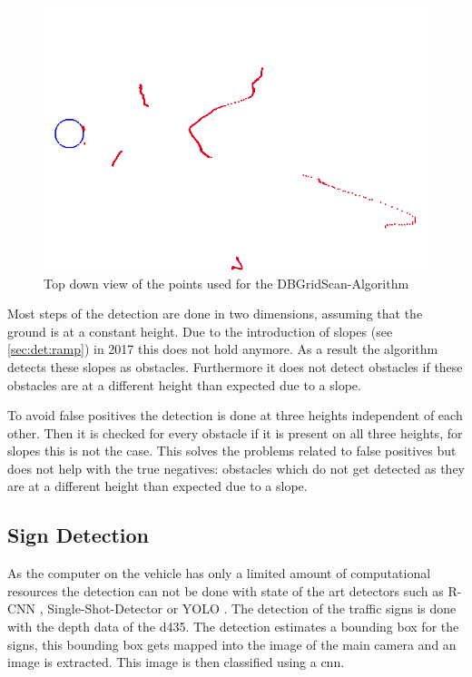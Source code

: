 \begin{figure}[h!]
    \centering
    \includegraphics[width=\textwidth]{../Material/depth_slice.png}
    \caption{Top down view of the points used for the DBGridScan-Algorithm}
    \label{fig:det:dbtopdown}
\end{figure}

Most steps of the detection are done in two dimensions, assuming that the ground is at a constant height. 
Due to the introduction of slopes (see \ref{sec:det:ramp}) in 2017 this does not hold anymore. 
As a result the algorithm detects these slopes as obstacles. 
Furthermore it does not detect obstacles if these obstacles are at a different height than expected due to a slope.

To avoid false positives the detection is done at three heights independent of each other. 
Then it is checked for every obstacle if it is present on all three heights, for slopes this is not the case. 
This solves the problems related to false positives but does not help with the true negatives: obstacles which do not get detected as they are at a different height than expected due to a slope.

\subsection{Sign Detection}
As the computer on the vehicle has only a limited amount of computational resources the detection can not be done with state of the art detectors such as R-CNN \cite{rcnn}, Single-Shot-Detector \cite{ssd} or YOLO \cite{yolo}. The detection of the traffic signs is done with the depth data of the \ac{d435}. The detection estimates a bounding box for the signs, this bounding box gets mapped into the image of the main camera and an image is extracted. This image is then classified using a \ac{cnn}.

